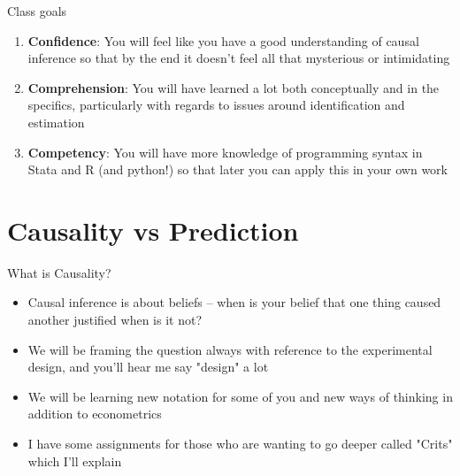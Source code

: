 \documentclass{beamer}
\begin{document}
\begin{frame}{Class goals}

  \begin{enumerate}
    \item \textbf{Confidence}: You will feel like you have a good understanding of causal inference so that by the end it doesn't feel all that mysterious or intimidating
    \item \textbf{Comprehension}: You will have learned a lot both conceptually and in the specifics, particularly with regards to issues around identification and estimation
    \item \textbf{Competency}: You will have more knowledge of programming syntax in Stata and R (and python!) so that later you can apply this in your own work
  \end{enumerate}

\end{frame}











\section{Causality vs Prediction}


\begin{frame}{What is Causality?}

\begin{itemize}
\item Causal inference is about beliefs -- when is your belief that one thing caused another justified when is it not?
\item We will be framing the question always with reference to the experimental design, and you'll hear me say "design" a lot
\item We will be learning new notation for some of you and new ways of thinking in addition to econometrics
\item I have some assignments for those who are wanting to go deeper called "Crits" which I'll explain
\end{itemize}

\end{frame}
\end{document}
